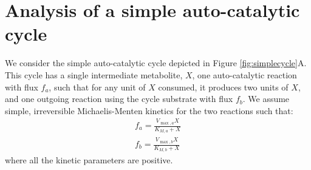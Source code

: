 \documentclass[a4page,notitlepage]{article}
\begin{document}
\section{Analysis of a simple auto-catalytic cycle}
    We consider the simple auto-catalytic cycle depicted in Figure \ref{fig:simplecycle}A.
    This cycle has a single intermediate metabolite, $X$, one auto-catalytic reaction with flux $f_a$, such that for any unit of $X$ consumed, it produces two units of $X$, and one outgoing reaction using the cycle substrate with flux $f_b$.
    We assume simple, irreversible Michaelis-Menten kinetics for the two reactions such that:
    \begin{eqnarray*}
      f_a = \frac{V_{\max,a}X}{K_{M,a}+X} \\
      f_b = \frac{V_{\max,b}X}{K_{M,b}+X}
    \end{eqnarray*}
    where all the kinetic parameters are positive.
\end{document}
